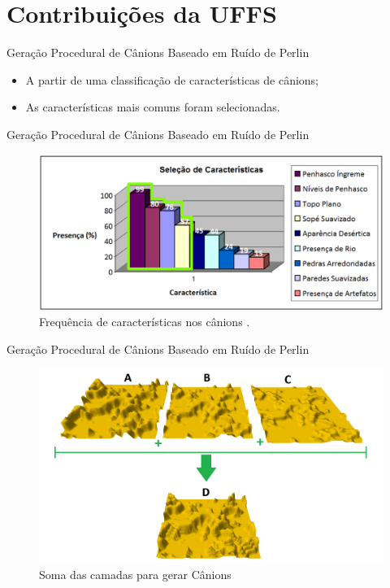 \section{Contribuições da UFFS}

\begin{frame}{Geração Procedural de Cânions Baseado em Ruído de Perlin}
  \begin{itemize}
        \item A partir de uma classificação de características de cânions;
        \item As características mais comuns foram selecionadas.
    \end{itemize}
\end{frame}

\begin{frame}{Geração Procedural de Cânions Baseado em Ruído de Perlin}
  \begin{figure}
		\centering
        \includegraphics[width=.8\textwidth]{img/uffs/caract.png}
        \caption{Frequência de características nos cânions 
        \cite{gabrielle2016canion}.}
  \end{figure}
\end{frame}

\begin{frame}{Geração Procedural de Cânions Baseado em Ruído de Perlin}
  \begin{figure}
		\centering
        \includegraphics[width=.8\textwidth]{img/uffs/gabrielleDev.png}
        \caption{Soma das camadas para gerar Cânions}
  \end{figure}
\end{frame}

